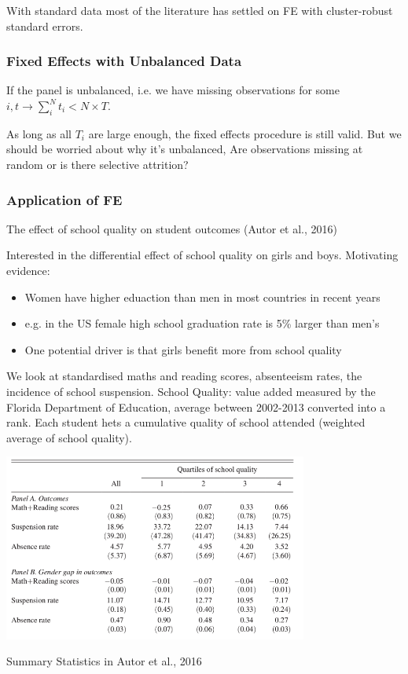 \documentclass[11pt]{article}
\begin{document}
\begin{note}
With standard data most of the literature has settled on FE with cluster-robust standard errors.    
\end{note}

\subsubsection{Fixed Effects with Unbalanced Data}

If the panel is unbalanced, i.e. we have missing observations for some $i,t \rightarrow \sum_i^N t_i <N\times T$. 

As long as all $T_i$ are large enough, the fixed effects procedure is still valid. But we should be worried about why it's unbalanced, Are observations missing at random or is there selective attrition?

\subsubsection{Application of FE}

    The effect of school quality on student outcomes (Autor et al., 2016)

Interested in the differential effect of school quality on girls and boys. Motivating evidence:
\begin{itemize}
    \item Women have higher eduaction than men in most countries in recent years
    \item e.g. in the US female high school graduation rate is 5\% larger than men's
    \item One potential driver is that girls benefit more from school quality
\end{itemize}

We look at standardised maths and reading scores, absenteeism rates, the incidence of school suspension. School Quality: value added measured by the Florida Department of Education, average between 2002-2013 converted into a rank. Each student hets a cumulative quality of school attended (weighted average of school quality).

\begin{table}[h]
    \centering
    \includegraphics[width=10cm]{photos/fe application sum stats.png}
    \caption{Summary Statistics in Autor et al., 2016}
    \label{tab:fe summary stats}
\end{table}
\end{document}
